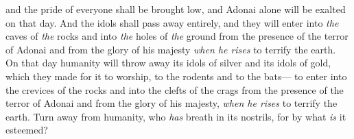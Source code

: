 \begin{biblechapter}
and the pride of everyone shall be brought low, 
and Adonai alone will be exalted on that day.
\verse And the idols shall pass away entirely,
\verse and they will enter into \textit{the} caves of \textit{the} rocks 
and into \textit{the} holes of \textit{the} ground 
from the presence of the terror of Adonai 
and from the glory of his majesty 
\textit{when he rises} to terrify the earth.
\verse On that day humanity will throw away its idols of silver 
and its idols of gold, 
which they made for it to worship, 
to the rodents and to the bats—
\verse to enter into the crevices of the rocks 
and into the clefts of the crags 
from the presence of the terror of Adonai 
and from the glory of his majesty, 
\textit{when he rises} to terrify the earth.
\verse Turn away from humanity, 
who \textit{has} breath in its nostrils, 
for by what \textit{is} it esteemed?
\end{biblechapter}

